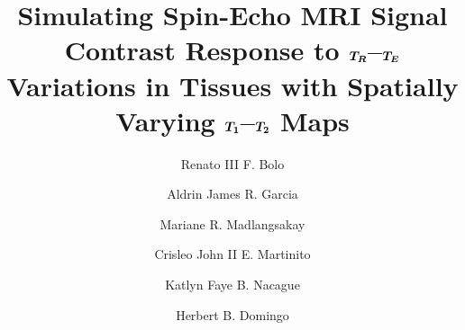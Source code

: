 \documentclass[10pt,a4paper,twoside]{article}
\begin{document}
\title{\TitleFont Simulating Spin-Echo MRI Signal Contrast Response to $\vb*{T_R}$–$\vb*{T_E}$ Variations in Tissues with Spatially Varying $\vb*{T_1}$–$\vb*{T_2}$ Maps}




\author[a,*]{Renato III F. Bolo\authorsep}
\author[a]{Aldrin James R. Garcia\authorsep}
\author[a]{Mariane R. Madlangsakay\authorsep}
\author[a]{Crisleo John II E. Martinito\authorsep}
\author[a]{Katlyn Faye B. Nacague\authorsep}
\author[a]{Herbert B. Domingo\lastauthorsep}
\end{document}
